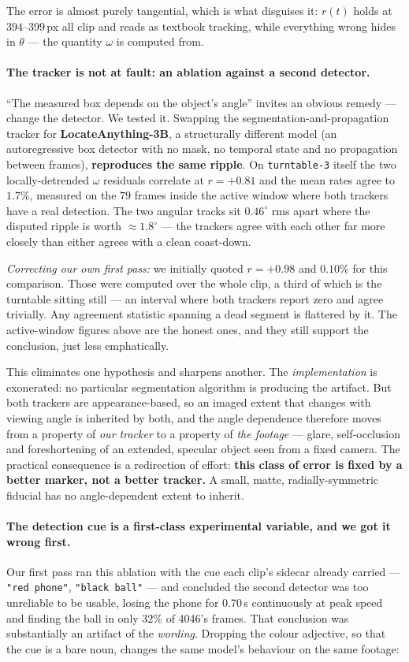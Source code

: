 \documentclass[11pt,a4paper]{article}
\begin{document}
The error is almost purely tangential, which is what disguises it: $r(t)$ holds at $394$--$399$\,px
all clip and reads as textbook tracking, while everything wrong hides in $\theta$ --- the quantity
$\omega$ is computed from.

\paragraph{The tracker is not at fault: an ablation against a second detector.}
``The measured box depends on the object's angle'' invites an obvious remedy --- change the
detector. We tested it. Swapping the segmentation-and-propagation tracker for
\textbf{LocateAnything-3B}, a structurally different model (an autoregressive box detector with no
mask, no temporal state and no propagation between frames), \textbf{reproduces the same ripple}. On
\texttt{turntable-3} itself the two locally-detrended $\omega$ residuals correlate at
$r={+}0.81$ and the mean rates agree to $1.7\%$, measured on the $79$ frames inside the active
window where both trackers have a real detection. The two angular tracks sit $0.46^\circ$ rms
apart where the disputed ripple is worth $\approx1.8^\circ$ --- the trackers agree with each other
far more closely than either agrees with a clean coast-down.

\emph{Correcting our own first pass:} we initially quoted $r={+}0.98$ and $0.10\%$ for this
comparison. Those were computed over the whole clip, a third of which is the turntable sitting
still --- an interval where both trackers report zero and agree trivially. Any agreement statistic
spanning a dead segment is flattered by it. The active-window figures above are the honest ones,
and they still support the conclusion, just less emphatically.

This eliminates one hypothesis and sharpens another. The \emph{implementation} is exonerated: no
particular segmentation algorithm is producing the artifact. But both trackers are appearance-based,
so an imaged extent that changes with viewing angle is inherited by both, and the angle dependence
therefore moves from a property of \emph{our tracker} to a property of \emph{the footage} --- glare,
self-occlusion and foreshortening of an extended, specular object seen from a fixed camera. The
practical consequence is a redirection of effort: \textbf{this class of error is fixed by a better
marker, not a better tracker.} A small, matte, radially-symmetric fiducial has no angle-dependent
extent to inherit.

\paragraph{The detection cue is a first-class experimental variable, and we got it wrong first.}
Our first pass ran this ablation with the cue each clip's sidecar already carried ---
\texttt{"red phone"}, \texttt{"black ball"} --- and concluded the second detector was too unreliable
to be usable, losing the phone for $0.70$\,s continuously at peak speed and finding the ball in only
$32\%$ of 4046's frames. That conclusion was substantially an artifact of the \emph{wording}.
Dropping the colour adjective, so that the cue is a bare noun, changes the same model's behaviour on
the same footage:
\end{document}
